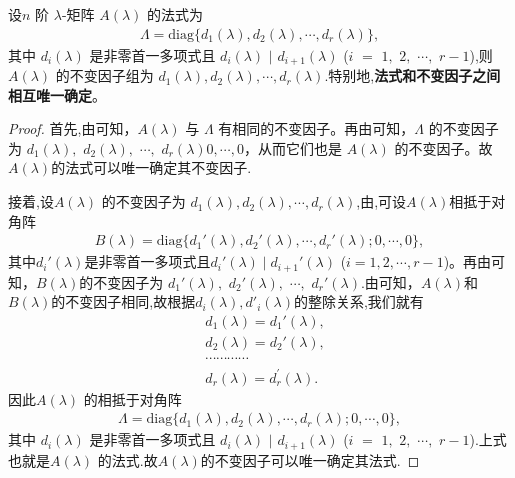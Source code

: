 \documentclass[../../main.tex]{subfiles}
\begin{document}
\begin{corollary}\label{corollary:不变因子和法式相互唯一确定}
设$n$ 阶 $\lambda$-矩阵 $A(\lambda)$ 的法式为
\begin{align*}
\varLambda=\mathrm{diag}\{d_1(\lambda),d_2(\lambda),\cdots,d_r(\lambda)\},
\end{align*}
其中 $d_i(\lambda)$ 是非零首一多项式且 $d_i(\lambda)$ $\mid$ $ d_{i + 1}(\lambda)$ ($i$ $=$ $1,$ $2,$ $\cdots,$ $r - 1$),则 $A(\lambda)$ 的不变因子组为 $d_1(\lambda),d_2(\lambda),\cdots,d_r(\lambda)$.特别地,\textbf{法式和不变因子之间相互唯一确定}。
\end{corollary}
\begin{proof}
首先,由可知，$A(\lambda)$ 与 $\varLambda$ 有相同的不变因子。再由可知，$\varLambda$ 的不变因子为 $d_1(\lambda),$ $d_2(\lambda),$ $\cdots,$ $d_r(\lambda)0,\cdots,0$，从而它们也是 $A(\lambda)$ 的不变因子。故$A(\lambda)$的法式可以唯一确定其不变因子.

接着,设$A(\lambda)$ 的不变因子为 $d_1(\lambda),d_2(\lambda),\cdots,d_r(\lambda)$,由,可设$A(\lambda)$相抵于对角阵
\begin{align}
B(\lambda)=\mathrm{diag}\{d_1'(\lambda),d_2'(\lambda),\cdots,d_r'(\lambda);0,\cdots,0\},
\end{align}
其中$d_i'(\lambda)$是非零首一多项式且$d_i'(\lambda)\mid d_{i + 1}'(\lambda)$ ($i = 1,2,\cdots,r - 1$)。再由可知，$B(\lambda)$的不变因子为 $d_1'(\lambda),$ $d_2'(\lambda),$ $\cdots,$ $d_r'(\lambda)$.由可知，$A(\lambda)$和$B(\lambda)$的不变因子相同,故根据$d_i(\lambda),d'_i(\lambda)$的整除关系,我们就有
\begin{align*}
&d_1\left( \lambda \right) =d_1'(\lambda ),
\\
&d_2\left( \lambda \right) =d_2' (\lambda ),
\\
&\cdots \cdots \cdots \cdots 
\\
&d_r\left( \lambda \right) =d_{r}^{\prime}\left( \lambda \right) .
\end{align*}
因此$A(\lambda)$ 的相抵于对角阵
\begin{align*}
\varLambda=\mathrm{diag}\{d_1(\lambda),d_2(\lambda),\cdots,d_r(\lambda);0,\cdots,0\},
\end{align*}
其中 $d_i(\lambda)$ 是非零首一多项式且 $d_i(\lambda)$ $\mid$ $ d_{i + 1}(\lambda)$ ($i$ $=$ $1,$ $2,$ $\cdots,$ $r - 1$).上式也就是$A(\lambda)$ 的法式.故$A(\lambda)$的不变因子可以唯一确定其法式.
\end{proof}
\end{document}
